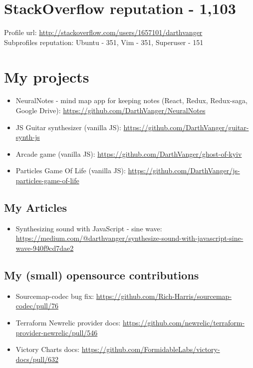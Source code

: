 \documentclass[a4paper, 14pt]{article}
\begin{document}
\section{StackOverflow reputation - 1,103}
  Profile url: \url{http://stackoverflow.com/users/1657101/darthvanger} \\
  Subprofiles reputation: Ubuntu - 351, Vim - 351, Superuser - 151

\section{My projects}
  \begin{itemize}
    \item NeuralNotes - mind map app for keeping notes (React, Redux, Redux-saga, Google Drive): \url{https://github.com/DarthVanger/NeuralNotes} \\
    \item JS Guitar synthesizer (vanilla JS): \url{https://github.com/DarthVanger/guitar-synth-js} \\
    \item Arcade game (vanilla JS): \url{https://github.com/DarthVanger/ghost-of-kyiv} \\
    \item Particles Game Of Life (vanilla JS): \url{https://github.com/DarthVanger/js-particles-game-of-life}
  \end{itemize}

  \subsection{My Articles}
    \begin{itemize}
      \item Synthesizing sound with JavaScript - sine wave: \url{https://medium.com/@darthvanger/synthesize-sound-with-javascript-sine-wave-940f9cd7dae2}
    \end{itemize}

  \subsection{My (small) opensource contributions}
    \begin{itemize}
      \item Sourcemap-codec bug fix: \url{https://github.com/Rich-Harris/sourcemap-codec/pull/76} \\
      \item Terraform Newrelic provider docs: \url{https://github.com/newrelic/terraform-provider-newrelic/pull/546} \\
      \item Victory Charts docs: \url{https://github.com/FormidableLabs/victory-docs/pull/632}
    \end{itemize}
\end{document}
